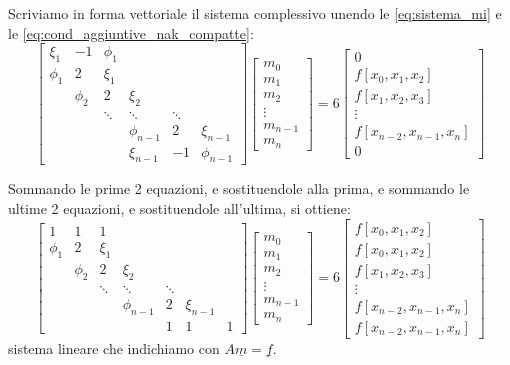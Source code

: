 Scriviamo in forma vettoriale il sistema complessivo unendo le \eqref{eq:sistema_mi} e le \eqref{eq:cond_aggiuntive_nak_compatte}:
\begin{equation*}
\begin{bmatrix}
\xi_1 & -1 & \phi_1 & & & \\
\phi_1 & 2 & \xi_1 & & & \\
& \phi_2 & 2 & \xi_2 & & \\
& & \ddots & \ddots & \ddots & \\
& & & \phi_{n-1} & 2 & \xi_{n-1} \\
& & & \xi_{n-1} & -1 & \phi_{n-1}
\end{bmatrix}
\begin{bmatrix}
m_0 \\ m_1 \\ m_2 \\ \vdots \\ m_{n-1} \\ m_n
\end{bmatrix}
=
6
\begin{bmatrix}
0 \\ f[x_0, x_1, x_2] \\ f[x_1, x_2, x_3] \\ \vdots \\ f[x_{n-2}, x_{n-1}, x_n] \\ 0
\end{bmatrix}
\end{equation*}

Sommando le prime 2 equazioni, e sostituendole alla prima, e sommando le ultime 2 equazioni, e sostituendole all'ultima, si ottiene:
\begin{equation} \label{eq:sistema_nak_A}
\begin{bmatrix}
1 & 1 & 1 & & & \\
\phi_1 & 2 & \xi_1 & & & \\
& \phi_2 & 2 & \xi_2 & & \\
& & \ddots & \ddots & \ddots & \\
& & & \phi_{n-1} & 2 & \xi_{n-1} \\
& & & & 1 & 1 & 1
\end{bmatrix}
\begin{bmatrix}
m_0 \\ m_1 \\ m_2 \\ \vdots \\ m_{n-1} \\ m_n
\end{bmatrix}
= 6
\begin{bmatrix}
f[x_0, x_1, x_2] \\
f[x_0, x_1, x_2] \\
f[x_1, x_2, x_3] \\
\vdots \\
f[x_{n-2}, x_{n-1}, x_n] \\
f[x_{n-2}, x_{n-1}, x_n]
\end{bmatrix}
\end{equation}
sistema lineare che indichiamo con $A \underline{m} = \underline{f}$.


